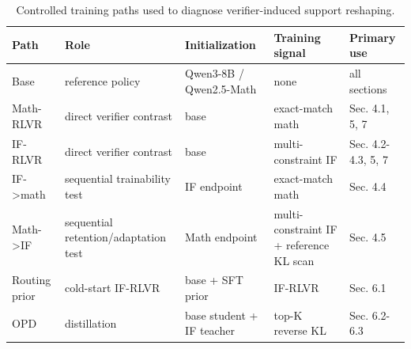 \begin{table}[t]
\centering
\small
\caption{Controlled training paths used to diagnose verifier-induced support reshaping.}
\label{tab:setup-paths}
\begin{tabular}{lllll}
\toprule
Path & Role & Initialization & Training signal & Primary use \\
\midrule
Base & reference policy & Qwen3-8B / Qwen2.5-Math & none & all sections \\
Math-RLVR & direct verifier contrast & base & exact-match math & Sec. 4.1, 5, 7 \\
IF-RLVR & direct verifier contrast & base & multi-constraint IF & Sec. 4.2-4.3, 5, 7 \\
IF->math & sequential trainability test & IF endpoint & exact-match math & Sec. 4.4 \\
Math->IF & sequential retention/adaptation test & Math endpoint & multi-constraint IF + reference KL scan & Sec. 4.5 \\
Routing prior & cold-start IF-RLVR & base + SFT prior & IF-RLVR & Sec. 6.1 \\
OPD & distillation & base student + IF teacher & top-K reverse KL & Sec. 6.2-6.3 \\
\bottomrule
\end{tabular}
\end{table}
